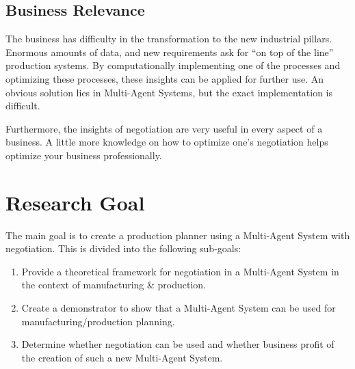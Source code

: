 \subsection{Business Relevance}

The business has difficulty in the transformation to the new industrial pillars. Enormous amounts of data, and new requirements ask for ``on top of the line'' production systems. By computationally implementing one of the processes and optimizing these processes, these insights can be applied for further use. An obvious solution lies in Multi-Agent Systems, but the exact implementation is difficult. 

Furthermore, the insights of negotiation are very useful in every aspect of a business. A little more knowledge on how to optimize one's negotiation helps optimize your business professionally.
\section{Research Goal}
The main goal is to create a production planner using a Multi-Agent System with negotiation. This is divided into the following sub-goals:
\begin{enumerate}
	\item
	Provide a theoretical framework for negotiation in a Multi-Agent System in the context of manufacturing \& production.
	\item
	Create a demonstrator to show that a Multi-Agent System can be used for manufacturing/production planning.
	\item
	Determine whether negotiation can be used and whether business profit of the creation of such a new Multi-Agent System.
	
\end{enumerate} 


